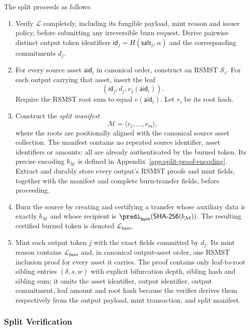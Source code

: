 The split proceeds as follows:
\begin{enumerate}
	\item Verify $\mathcal{L}$ completely, including its fungible payload, mint reason and issuer policy, before submitting any irreversible burn request.  Derive pairwise distinct output token identifiers $\mathsf{id}_j=H(\mathsf{salt}_j,\alpha)$ and the corresponding commitments $d_j$.
	\item For every source asset $\mathsf{aid}_i$ in canonical order, construct an RSMST $\mathcal{S}_i$.  For each output carrying that asset, insert the leaf
	\[
	(\mathsf{id}_j,d_j,v_j(\mathsf{aid}_i)).
	\]
	Require the RSMST root sum to equal $v(\mathsf{aid}_i)$.  Let $r_i$ be its root hash.
	\item Construct the \emph{split manifest}
	\[
	\mathcal{M}=\langle r_1,\ldots,r_m\rangle,
	\]
	where the roots are positionally aligned with the canonical source asset collection.  The manifest contains no repeated source identifier, asset identifiers or amounts: all are already authenticated by the burned token.  Its precise encoding $b_\mathcal{M}$ is defined in Appendix~\ref{app:split-proof-encoding}.  Extract and durably store every output's RSMST proofs and mint fields, together with the manifest and complete burn-transfer fields, before proceeding.
	\item Burn the source by creating and certifying a transfer whose auxiliary data is exactly $b_\mathcal{M}$ and whose recipient is $\predi_\mathsf{burn}(\mathsf{SHA\text{-}256}(b_\mathcal{M}))$.  The resulting certified burned token is denoted $\mathcal{L}_\mathsf{burn}$.
	\item Mint each output token $j$ with the exact fields committed by $d_j$.  Its mint reason contains $\mathcal{L}_\mathsf{burn}$ and, in canonical output-asset order, one RSMST inclusion proof for every asset it carries.  The proof contains only leaf-to-root sibling entries $(\delta,s,w)$ with explicit bifurcation depth, sibling hash and sibling sum; it omits the asset identifier, output identifier, output commitment, leaf amount and root hash because the verifier derives them respectively from the output payload, mint transaction, and split manifest.
\end{enumerate}


\subsubsection{Split Verification}\label{sec:split-verification}

